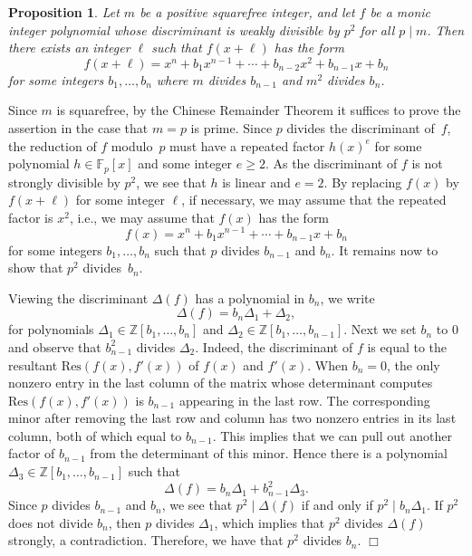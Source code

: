 \documentclass[11pt]{article}
\def\Z{{\mathbb Z}}
\def\F{{\mathbb F}}
\def\Z{{\mathbb Z}}
\def\F{{\mathbb F}}
\def\Res{{\textrm{Res}}}
\newtheorem{proposition}[theorem]{Proposition}
\newenvironment{proof}{\noindent {\bf Proof:}}{$\Box$ \vspace{2 ex}}
\begin{document}
\begin{proposition}\label{prop:hiddenp2}
Let $m$ be a positive squarefree integer, and let $f$ be a monic
integer polynomial whose discriminant is weakly divisible by $p^2$ for all $p\mid m$.
Then there exists an integer $\ell$ such that $f(x+\ell )$ has
the form
\begin{equation}
f(x+\ell ) = x^n + b_1x^{n-1} + \cdots + b_{n-2}x^2 + b_{n-1}x +
b_n
\end{equation}
for some integers $b_1,\ldots,b_n$ where $m$ divides $b_{n-1}$ and $m^2$ divides $b_n$.
\end{proposition}
\begin{proof}
Since $m$ is squarefree, by the Chinese Remainder Theorem it suffices
to prove the assertion in the case that $m=p$ is prime. Since $p$
divides the discriminant of~$f$, the reduction of $f$ modulo~$p$ must
have a repeated factor $h(x)^e$ for some polynomial $h\in \F_p[x]$ and
some integer $e\geq2$. As the discriminant of $f$ is not strongly
divisible by $p^2$, we see that $h$ is linear and $e=2$. By replacing
$f(x)$ by $f(x+\ell )$ for some integer $\ell$, if necessary, we may
assume that the repeated factor is $x^2$, i.e., we may assume that
$f(x)$ has the form $$f(x) = x^n + b_1x^{n-1} + \cdots + b_{n-1}x +
b_n$$ for some integers $b_1,\ldots,b_n$ such that $p$ divides
$b_{n-1}$ and $b_n$. It remains now to show that $p^2$ divides~$b_n$.

Viewing the discriminant $\Delta(f)$ has a polynomial in $b_n$,
we write
$$\Delta(f) = b_n\Delta_1 + \Delta_2,$$ for polynomials $\Delta_1\in
\Z[b_1,\ldots,b_n]$ and $\Delta_2\in \Z[b_1,\ldots,b_{n-1}]$. Next we
set $b_n$ to $0$ and observe that $b_{n-1}^2$ divides
$\Delta_2$. Indeed, the discriminant of $f$ is equal to the resultant
$\Res(f(x),f'(x))$ of $f(x)$ and $f'(x)$.  When $b_n=0$, the only
nonzero entry in the last column of the matrix whose determinant
computes $\Res(f(x),f'(x))$ is $b_{n-1}$ appearing in the last
row. The corresponding minor after removing the last row and column
has two nonzero entries in its last column, both of which equal to
$b_{n-1}$. This implies that we can pull out another factor of $b_{n-1}$ from the determinant of this minor.
Hence there is a polynomial $\Delta_3\in
\Z[b_1,\ldots,b_{n-1}]$ such that
\begin{equation}\Delta(f) = b_n\Delta_1 + b_{n-1}^2\Delta_3.
\end{equation}
Since $p$ divides $b_{n-1}$ and $b_n$, we see that $p^2\mid \Delta(f)$
if and only if $p^2\mid b_n\Delta_1$. If $p^2$ does not divide $b_n$,
then $p$ divides $\Delta_1$, which implies that $p^2$ divides $\Delta(f)$
strongly, a contradiction. Therefore, we have that $p^2$ divides $b_n$.
\end{proof}
\end{document}
